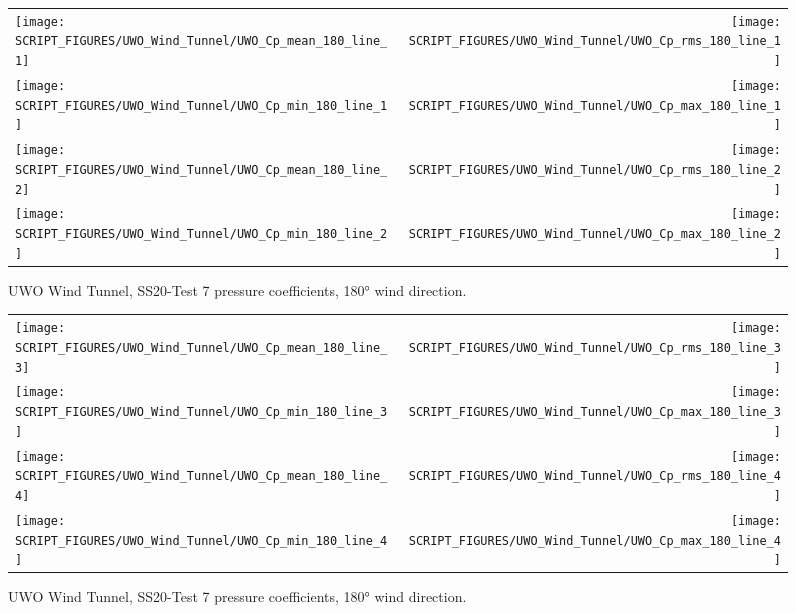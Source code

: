 \begin{figure}[p]
\begin{tabular*}{\textwidth}{l@{\extracolsep{\fill}}r}
\texttt{[image: SCRIPT\_FIGURES/UWO\_Wind\_Tunnel/UWO\_Cp\_mean\_180\_line\_1]} &
\texttt{[image: SCRIPT\_FIGURES/UWO\_Wind\_Tunnel/UWO\_Cp\_rms\_180\_line\_1]} \\
\texttt{[image: SCRIPT\_FIGURES/UWO\_Wind\_Tunnel/UWO\_Cp\_min\_180\_line\_1]} &
\texttt{[image: SCRIPT\_FIGURES/UWO\_Wind\_Tunnel/UWO\_Cp\_max\_180\_line\_1]} \\
\texttt{[image: SCRIPT\_FIGURES/UWO\_Wind\_Tunnel/UWO\_Cp\_mean\_180\_line\_2]} &
\texttt{[image: SCRIPT\_FIGURES/UWO\_Wind\_Tunnel/UWO\_Cp\_rms\_180\_line\_2]} \\
\texttt{[image: SCRIPT\_FIGURES/UWO\_Wind\_Tunnel/UWO\_Cp\_min\_180\_line\_2]} &
\texttt{[image: SCRIPT\_FIGURES/UWO\_Wind\_Tunnel/UWO\_Cp\_max\_180\_line\_2]}
\end{tabular*}
\caption[UWO Wind Tunnel, SS20-Test 7 pressure coefficients, 180\si{\degree}]{UWO Wind Tunnel, SS20-Test 7 pressure coefficients, 180\si{\degree} wind direction.}
\label{UWO_Test_7_pressure_coefficients_180_1}
\end{figure}

\begin{figure}[p]
\begin{tabular*}{\textwidth}{l@{\extracolsep{\fill}}r}
\texttt{[image: SCRIPT\_FIGURES/UWO\_Wind\_Tunnel/UWO\_Cp\_mean\_180\_line\_3]} &
\texttt{[image: SCRIPT\_FIGURES/UWO\_Wind\_Tunnel/UWO\_Cp\_rms\_180\_line\_3]} \\
\texttt{[image: SCRIPT\_FIGURES/UWO\_Wind\_Tunnel/UWO\_Cp\_min\_180\_line\_3]} &
\texttt{[image: SCRIPT\_FIGURES/UWO\_Wind\_Tunnel/UWO\_Cp\_max\_180\_line\_3]} \\
\texttt{[image: SCRIPT\_FIGURES/UWO\_Wind\_Tunnel/UWO\_Cp\_mean\_180\_line\_4]} &
\texttt{[image: SCRIPT\_FIGURES/UWO\_Wind\_Tunnel/UWO\_Cp\_rms\_180\_line\_4]}  \\
\texttt{[image: SCRIPT\_FIGURES/UWO\_Wind\_Tunnel/UWO\_Cp\_min\_180\_line\_4]} &
\texttt{[image: SCRIPT\_FIGURES/UWO\_Wind\_Tunnel/UWO\_Cp\_max\_180\_line\_4]}
\end{tabular*}
\caption[UWO Wind Tunnel, SS20-Test 7 pressure coefficients, 180\si{\degree}]{UWO Wind Tunnel, SS20-Test 7 pressure coefficients, 180\si{\degree} wind direction.}
\label{UWO_Test_7_pressure_coefficients_180_2}
\end{figure}

